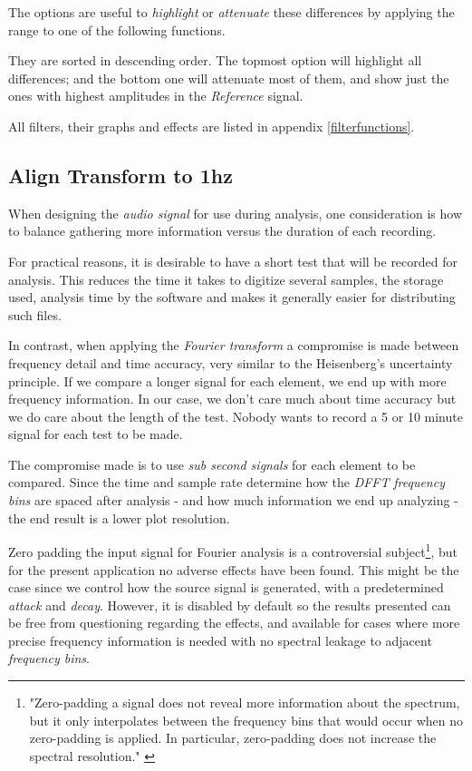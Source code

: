 \documentclass[10pt,a4paper]{report}
\begin{document}
The options are useful to \textit{highlight} or \textit{attenuate} these differences by applying the range to one of the following functions. 

They are sorted in descending order. The topmost option will highlight all differences; and the bottom one will attenuate most of them, and show just the ones with highest amplitudes in the \textit{Reference} signal.

All filters, their graphs and effects are listed in appendix \ref{filterfunctions}.

\subsection{Align Transform to 1hz}

When designing the \textit{audio signal} for use during analysis, one consideration is how to balance gathering more information versus the duration of each recording. 

For practical reasons, it is desirable to have a short test that will be recorded for analysis. This reduces the time it takes to digitize several samples, the storage used, analysis time by the software and makes it generally easier for distributing such files.

In contrast, when applying the \textit{Fourier transform} a compromise is made between frequency detail and time accuracy, very similar to the Heisenberg's uncertainty principle. If we compare a longer signal for each element, we end up with more frequency information. In our case, we don't care much about time accuracy but we do care about the length of the test. Nobody wants to record a 5 or 10 minute signal for each test to be made.

The compromise made is to use \textit{sub second signals} for each element to be compared. Since the time and sample rate determine how the \textit{DFFT} \textit{frequency bins} are spaced after analysis - and how much information we end up analyzing - the end result is a lower plot resolution.

Zero padding the input signal for Fourier analysis is a controversial subject\footnote{"Zero-padding a signal does not reveal more information about the spectrum, but it only interpolates between the frequency bins that would occur when no zero-padding is applied. In particular, zero-padding does not increase the spectral resolution." \cite{zeropaddinginterpolate} \cite{ZeroPaddingBad}}, but for the present application no adverse effects have been found. This might be the case since we control how the source signal is generated, with a predetermined \textit{attack} and \textit{decay}. However, it is disabled by default so the results presented can be free from questioning regarding the effects, and available for cases where more precise frequency information is needed with no spectral leakage to adjacent \textit{frequency bins}.
\end{document}
